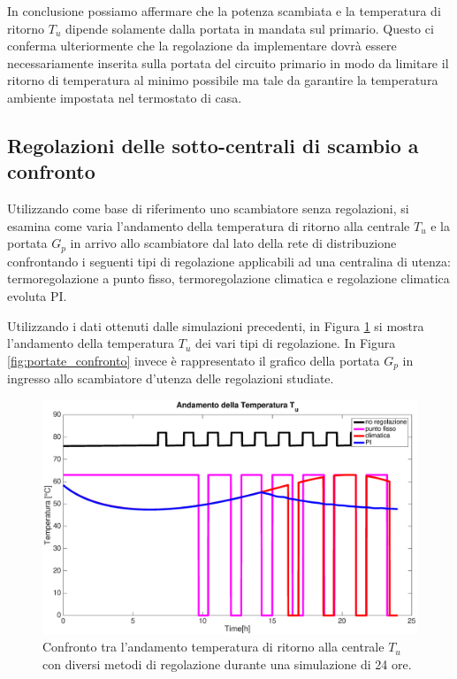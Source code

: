 \documentclass[laurea,oneside,11pt]{USiena_tesiLM3}
\begin{document}
In conclusione possiamo affermare che la potenza scambiata e la temperatura di ritorno $T_u$ dipende solamente dalla portata in mandata sul primario.
Questo ci conferma ulteriormente che la regolazione da implementare dovrà essere necessariamente inserita sulla portata del circuito primario in modo da limitare il ritorno di temperatura al minimo possibile ma tale da garantire la temperatura ambiente impostata nel termostato di casa.

\subsection{Regolazioni delle sotto-centrali di scambio a confronto}
Utilizzando come base di riferimento uno scambiatore senza regolazioni, si esamina come varia l'andamento della temperatura di ritorno alla centrale $T_u$ e la portata $G_p$ in arrivo allo scambiatore dal lato della rete di distribuzione  confrontando i seguenti tipi di regolazione applicabili ad una centralina di utenza: termoregolazione a punto fisso, termoregolazione climatica e regolazione climatica evoluta PI.

Utilizzando i dati ottenuti dalle simulazioni precedenti, in Figura \ref{fig:To_confronto}  si mostra l'andamento della  temperatura $T_u$ dei vari tipi di regolazione. In Figura \ref{fig:portate_confronto} invece è rappresentato il grafico della portata $G_p$ in ingresso allo scambiatore d'utenza delle regolazioni studiate. 

\begin{figure}[!ht]
\centering
\includegraphics[width=\textwidth]{figure/To_confronto} 
\caption{Confronto tra l'andamento temperatura di ritorno alla centrale $T_u$ con diversi metodi di regolazione durante una simulazione di 24 ore.}
\label{fig:To_confronto}
\end{figure}
\end{document}
